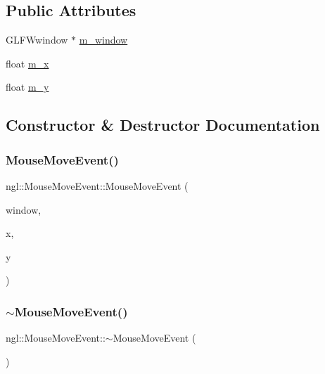 \subsection*{Public Attributes}
\begin{DoxyCompactItemize}
\item 
G\+L\+F\+Wwindow $\ast$ \mbox{\hyperlink{structngl_1_1_mouse_move_event_ab4de090e81b56e55f9765ed328ab057f}{m\+\_\+window}}
\item 
float \mbox{\hyperlink{structngl_1_1_mouse_move_event_a46dfc1a09e5a747a621236f016d0bf89}{m\+\_\+x}}
\item 
float \mbox{\hyperlink{structngl_1_1_mouse_move_event_aec6b82c05efa48f66641f3f450e995aa}{m\+\_\+y}}
\end{DoxyCompactItemize}


\subsection{Constructor \& Destructor Documentation}
\mbox{\label{structngl_1_1_mouse_move_event_ae042bbcdcf8f44b580f1403496c7bc76}} 
\subsubsection{\texorpdfstring{Mouse\+Move\+Event()}{MouseMoveEvent()}}
{\footnotesize\ttfamily ngl\+::\+Mouse\+Move\+Event\+::\+Mouse\+Move\+Event (\begin{DoxyParamCaption}\item[{G\+L\+F\+Wwindow $\ast$}]{window,  }\item[{const float}]{x,  }\item[{const float}]{y }\end{DoxyParamCaption})}

\mbox{\label{structngl_1_1_mouse_move_event_a67938231a8996f8cd69a0d2f7ae1506e}} 
\subsubsection{\texorpdfstring{$\sim$\+Mouse\+Move\+Event()}{~MouseMoveEvent()}}
{\footnotesize\ttfamily ngl\+::\+Mouse\+Move\+Event\+::$\sim$\+Mouse\+Move\+Event (\begin{DoxyParamCaption}{ }\end{DoxyParamCaption})}



